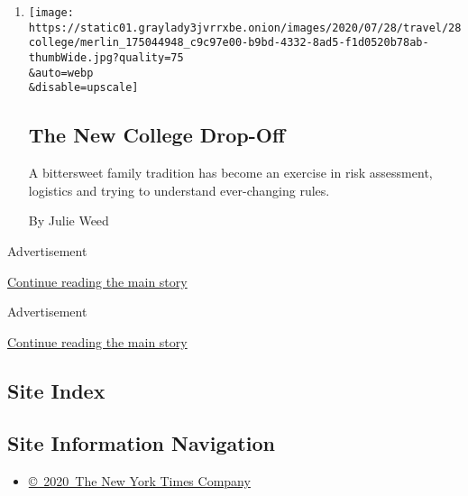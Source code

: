 \begin{enumerate}
\def\labelenumi{\arabic{enumi}.}
\item
  \href{/2020/07/29/travel/virus-college-travel-restrictions.html}{}

  \texttt{[image: https://static01.graylady3jvrrxbe.onion/images/2020/07/28/travel/28college/merlin\_175044948\_c9c97e00-b9bd-4332-8ad5-f1d0520b78ab-thumbWide.jpg?quality=75\\\&auto=webp\\\&disable=upscale]}

  \hypertarget{the-new-college-drop-off}{%
  \subsection{The New College Drop-Off}\label{the-new-college-drop-off}}

  A bittersweet family tradition has become an exercise in risk
  assessment, logistics and trying to understand ever-changing rules.

  By Julie Weed
\end{enumerate}

Advertisement

\protect\hyperlink{after-mid2}{Continue reading the main story}

Advertisement

\protect\hyperlink{after-mktg}{Continue reading the main story}

\hypertarget{site-index}{%
\subsection{Site Index}\label{site-index}}

\hypertarget{site-information-navigation}{%
\subsection{Site Information
Navigation}\label{site-information-navigation}}

\begin{itemize}
\tightlist
\item
  \href{https://help.nytimes3xbfgragh.onion/hc/en-us/articles/115014792127-Copyright-notice}{©~2020~The
  New York Times Company}
\end{itemize}

